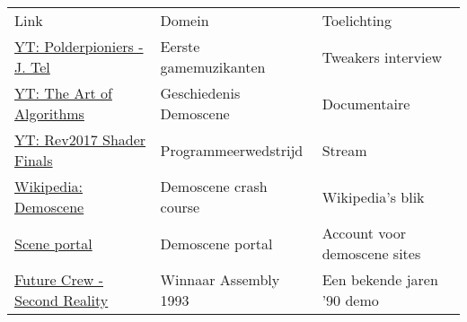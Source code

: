 \documentclass{article}
\begin{document}
\begin{tabular}{l|l|l}
Link & Domein & Toelichting \\
\href{https://www.youtube.com/watch?v=AdTANxS-LHg}{YT: Polderpioniers - J. Tel} & Eerste gamemuzikanten & Tweakers interview \\
\href{https://www.youtube.com/watch?v=5MexnBunH_g}{YT: The Art of Algorithms} & Geschiedenis Demoscene & Documentaire \\
\href{https://www.youtube.com/watch?v=O-1zEo7DD8w}{YT: Rev2017 Shader Finals} & Programmeerwedstrijd & Stream \\
\href{https://en.wikipedia.org/wiki/Demoscene}{Wikipedia: Demoscene} & Demoscene crash course & Wikipedia's blik \\
\href{https://id.scene.org/}{Scene portal} & Demoscene portal & Account voor demoscene sites \\
\href{https://www.youtube.com/watch?v=rFv7mHTf0nA}{Future Crew - Second Reality} & Winnaar Assembly 1993 & Een bekende jaren '90 demo \\
\end{tabular}
\end{document}
